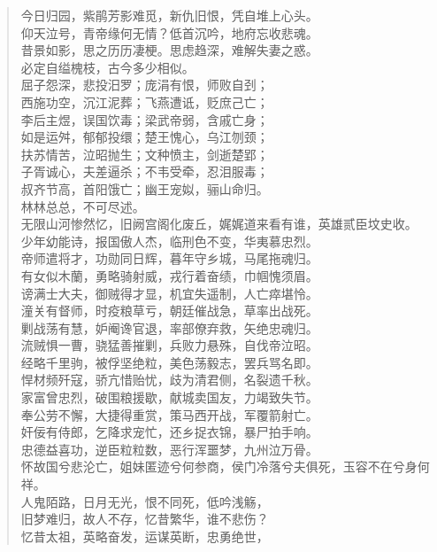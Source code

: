\documentclass[12pt,oneside]{book}
\newenvironment{shici}{%
\begin{verse}%
\centering\large\hspace{12pt}}%
{\end{verse}}
\begin{document}
\begin{shici}
今日归园，紫鹃芳影难觅，新仇旧恨，凭自堆上心头。\\
仰天泣号，青帝缘何无情？低首沉吟，地府忘收悲魂。\\
昔景如影，思之历历凄梗。思虑趋深，难解失妻之惑。\\
必定自缢槐枝，古今多少相似。\\
屈子怨深，悲投汨罗；庞涓有恨，师败自刭；\\
西施功空，沉江泥葬；飞燕遭诋，贬庶己亡；\\
李后主煜，误国饮毒；梁武帝弱，含戚亡身；\\
如是运舛，郁郁投缳；楚王愧心，乌江刎颈；\\
扶苏情苦，泣昭抛生；文种愤主，剑逝楚郢；\\
子胥诚心，夫差逼杀；不韦受牵，忍泪服毒；\\
叔齐节高，首阳饿亡；幽王宠姒，骊山命归。\\
林林总总，不可尽述。\\
无限山河惨然忆，旧阙宫阁化废丘，娓娓道来看有谁，英雄贰臣坟史收。\\
少年幼能诗，报国傲人杰，临刑色不变，华夷慕忠烈。\\
帝师遣将才，功勋同日辉，暮年守乡城，马尾拖魂归。\\
有女似木蘭，勇略骑射威，戎行着奋绩，巾帼愧须眉。\\
谤满士大夫，御贼得才显，机宜失遥制，人亡瘁堪怜。\\
潼关有督师，时疫粮草亏，朝廷催战急，草率出战死。\\
剿战荡有慧，妒阉谗官退，率部僚弃救，矢绝忠魂归。\\
流贼惧一曹，骁猛善摧剿，兵败力悬殊，自伐帝泣昭。\\
经略千里驹，被俘坚绝粒，美色荡毅志，罢兵骂名即。\\
悍材频歼寇，骄亢惜贻忧，歧为清君侧，名裂遗千秋。\\
家富曾忠烈，破围粮援歇，献城卖国友，力竭致失节。\\
奉公劳不懈，大捷得重赏，策马西开战，军覆箭射亡。\\
奸佞有侍郎，乞降求宠忙，还乡捉衣锦，暴尸拍手响。\\
忠德益喜功，逆臣粒粒数，恶行浑噩梦，九州泣万骨。\\
怀故国兮悲沦亡，姐妹匿迹兮何参商，侯门冷落兮夫俱死，玉容不在兮身何祥。\\
人鬼陌路，日月无光，恨不同死，低吟浅觞，\\
旧梦难归，故人不存，忆昔繁华，谁不悲伤？\\
忆昔太祖，英略奋发，运谋英断，忠勇绝世，\\

\end{shici}
\end{document}
